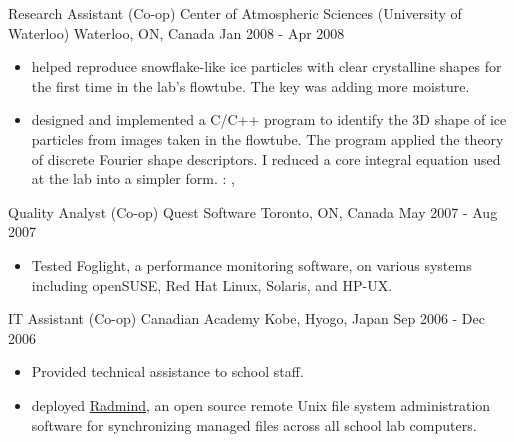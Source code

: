 \cventry
  {Research Assistant (Co-op)} %
  {Center of Atmospheric Sciences (University of Waterloo)} %
  {Waterloo, ON, Canada} %
  {Jan 2008 - Apr 2008} %
  {
    \begin{itemize} %
      \liststyle
      \item {helped reproduce snowflake-like ice particles with clear crystalline shapes for the first time in the lab's flowtube. The key was adding more moisture.}
      \item { designed and implemented a C/C++ program to identify the 3D shape of ice particles from images taken in the flowtube. 
      The program applied the theory of discrete Fourier shape descriptors.
      I reduced a core integral equation used at the lab into a simpler form.
      \tgskills: \rfcpp, \rfmysql}
    \end{itemize}
  }

\cventry
  {Quality Analyst (Co-op)} %
  {Quest Software} %
  {Toronto, ON, Canada} %
  {May 2007 - Aug 2007} %
  {
    \begin{itemize} %
      \liststyle
      \item {Tested Foglight, a performance monitoring software, on various systems including openSUSE, Red Hat Linux, Solaris, and HP-UX.}
    \end{itemize}
  }

\cventry
  {IT Assistant (Co-op)} %
  {Canadian Academy} %
  {Kobe, Hyogo, Japan} %
  {Sep 2006 - Dec 2006} %
  {
    \begin{itemize} %
      \liststyle
      \item {Provided technical assistance to school staff.}
      \item { deployed \href{http://www.radmind.org/}{Radmind}, an open source remote Unix file system administration software for synchronizing managed files across all school lab computers.}
    \end{itemize}
  }
